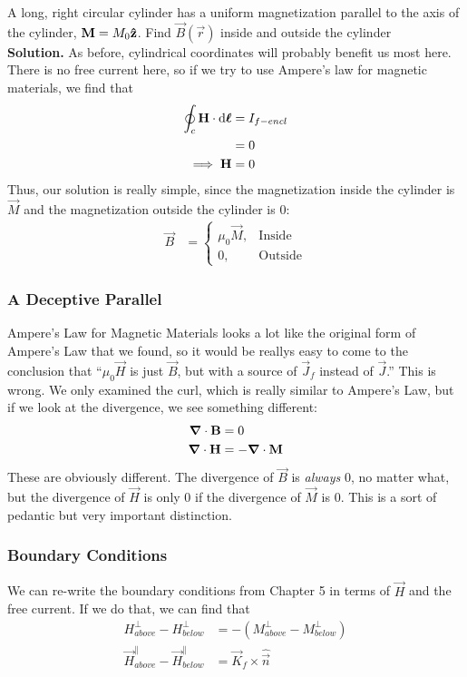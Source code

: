 \documentclass[a4paper]{article}
\begin{document}
\begin{eg}
	A long, right circular cylinder has a uniform magnetization parallel to
	the axis of the cylinder, $\boldsymbol{\mathbf{M}}=M_0\boldsymbol{\mathbf{\hat{z}}}$. Find $\vec{B}(\vec{r})$
	inside and outside the cylinder\\
	\textbf{Solution.}
	As before, cylindrical coordinates will probably benefit us most here.
	There is no free current here, so if we try to use Ampere's law for
	magnetic materials, we find that
	\begin{align*}
		\oint_c\boldsymbol{\mathbf{H}}\cdot\mathrm{d}\boldsymbol{\mathbf{\ell}} &= I_{f-encl}\\
						&= 0\\
		\implies \boldsymbol{\mathbf{H}} &= 0
	\end{align*}
	Thus, our solution is really simple, since the magnetization inside
	the cylinder is $\vec{M}$ and the magnetization outside the cylinder
	is 0:
	\begin{align*}
	\vec{B} &=
	\begin{cases}
		\mu_0\vec{M}, & \text{Inside}\\
		0, & \text{Outside}
	\end{cases}
	\end{align*}
\end{eg}

\subsubsection{A Deceptive Parallel}
Ampere's Law for Magnetic Materials looks a lot like the original form of
Ampere's Law that we found, so it would be reallys easy to come to the
conclusion that ``$\mu_0\vec{H}$ is just $\vec{B}$, but with a source of
$\vec{J}_f$ instead of $\vec{J}$.'' This is wrong. We only examined the curl,
which is really similar to Ampere's Law, but if we look at the divergence,
we see something different:
\begin{align*}
	\boldsymbol{\mathbf{\nabla}}\cdot\boldsymbol{\mathbf{B}} &= 0\\
	\boldsymbol{\mathbf{\nabla}}\cdot\boldsymbol{\mathbf{H}} &= -\boldsymbol{\mathbf{\nabla}}\cdot\boldsymbol{\mathbf{M}}
\end{align*}
These are obviously different. The divergence of $\vec{B}$ is \emph{always}
0, no matter what, but the divergence of $\vec{H}$ is only 0 if the divergence
of $\vec{M}$ is 0. This is a sort of pedantic but very important distinction.

\subsubsection{Boundary Conditions}
We can re-write the boundary conditions from Chapter 5 in terms of $\vec{H}$
and the free current. If we do that, we can find that
\begin{align*}
	H^\perp_{above}-H^\perp_{below}&=-(M^\perp_{above}-M^\perp_{below})\\
	\vec{H}^\parallel_{above}-\vec{H}^\parallel_{below}&=\vec{K}_f\times
		\hat{\vec{n}}
\end{align*}
\end{document}
